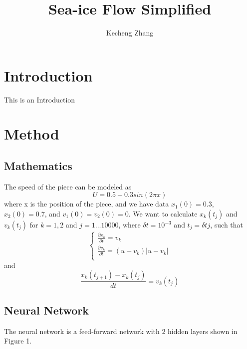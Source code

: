 \documentclass[12pt, a4paper]{article}
\begin{document}
\title{Sea-ice Flow Simplified}
\author{Kecheng Zhang}
\maketitle

\begin{abstract}
    
\end{abstract}

\section{Introduction}
This is an Introduction

\section{Method}

\subsection{Mathematics}
The speed of the piece can be modeled as
$$ U = 0.5 + 0.3sin(2 \pi x) $$
where x is the position of the piece, and we have data
$x_1(0) = 0.3$, $x_2(0) = 0.7$, and $v_1(0) = v_2(0) = 0$.
We want to calculate
$x_k(t_j)$ and $v_k(t_j)$ for $k = 1, 2$ and $j = 1\dots10000$, where
$\delta t = 10^{-3}$ and $t_j = \delta t j$, such that
$$\begin{cases}
    \frac{\partial x_k}{\partial t} = v_k\\
    \frac{\partial v_k}{\partial t} = (u - v_k) |u - v_k|\\
    \end{cases}$$
and $$ \frac{x_k(t_{j+1}) - x_k(t_j)}{dt} = v_k(t_j)$$

\subsection{Neural Network}
The neural network is a feed-forward network with 2 hidden layers shown in Figure 1.
\end{document}
